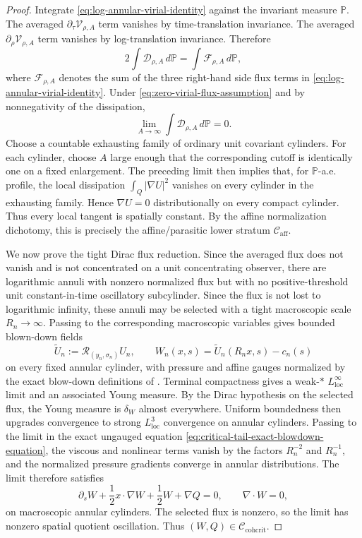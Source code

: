 \documentclass[11pt]{amsart}
\numberwithin{equation}{section}
\theoremstyle{plain}
\theoremstyle{definition}
\theoremstyle{remark}
\newcommand{\loc}{\mathrm{loc}}
\newcommand{\calR}{\mathcal R}
\newcommand{\Caff}{\mathcal C_{\mathrm{aff}}}
\newcommand{\Ccohcrit}{\mathcal C_{\mathrm{cohcrit}}}
\begin{document}
\begin{proof}
Integrate \eqref{eq:log-annular-virial-identity} against the invariant measure
\(\mathbb P\).  The averaged \(\partial_\tau\mathcal V_{\rho,A}\) term
vanishes by time-translation invariance.  The averaged
\(\partial_\rho\mathcal V_{\rho,A}\) term vanishes by log-translation
invariance.  Therefore
\[
   2\int \mathcal D_{\rho,A}\,d\mathbb P
   =
   \int \mathcal F_{\rho,A}\,d\mathbb P,
\]
where \(\mathcal F_{\rho,A}\) denotes the sum of the three right-hand side flux
terms in \eqref{eq:log-annular-virial-identity}.  Under
\eqref{eq:zero-virial-flux-assumption} and by nonnegativity of the dissipation,
\[
   \lim_{A\to\infty}\int \mathcal D_{\rho,A}\,d\mathbb P=0 .
\]
Choose a countable exhausting family of ordinary unit covariant cylinders.  For
each cylinder, choose \(A\) large enough that the corresponding cutoff is
identically one on a fixed enlargement.  The preceding limit then implies that,
for \(\mathbb P\)-a.e. profile, the local dissipation
\(\int_Q|\nabla U|^2\) vanishes on every cylinder in the exhausting family.
Hence \(\nabla U=0\) distributionally on every compact cylinder.  Thus every
local tangent is spatially constant.  By the affine normalization dichotomy,
this is precisely the affine/parasitic lower stratum \(\Caff\).

We now prove the tight Dirac flux reduction.  Since the averaged flux does not
vanish and is not concentrated on a unit concentrating observer, there are logarithmic
annuli with nonzero normalized flux but with no positive-threshold unit
constant-in-time oscillatory subcylinder.  Since the flux is not lost to logarithmic
infinity, these annuli may be selected with a tight macroscopic scale
\(R_n\to\infty\).  Passing to the corresponding macroscopic variables gives
bounded blown-down fields
\[
   \widetilde U_n:=\calR_{(y_n,\sigma_n)}U_n,\qquad
   W_n(x,s)=\widetilde U_n(R_nx,s)-c_n(s)
\]
on every fixed annular cylinder, with pressure and affine gauges normalized by
the exact blow-down definitions of .
Terminal compactness gives a
weak-\(*\) \(L^\infty_{\loc}\) limit and an associated Young measure.  By the
Dirac hypothesis on the selected flux, the Young measure is
\(\delta_W\) almost everywhere.  Uniform boundedness then upgrades convergence
to strong \(L^3_{\loc}\) convergence on annular cylinders.  Passing to the
limit in the exact ungauged equation
\eqref{eq:critical-tail-exact-blowdown-equation}, the viscous and nonlinear
terms vanish by the factors \(R_n^{-2}\) and \(R_n^{-1}\), and the normalized
pressure gradients converge in annular distributions.  The limit therefore satisfies
\[
   \partial_s W+\frac12x\cdot\nabla W+\frac12W+\nabla Q=0,
   \qquad \nabla\cdot W=0,
\]
on macroscopic annular cylinders.  The selected flux is nonzero, so the limit
has nonzero spatial quotient oscillation.  Thus \((W,Q)\in\Ccohcrit\).
\end{proof}
\end{document}
